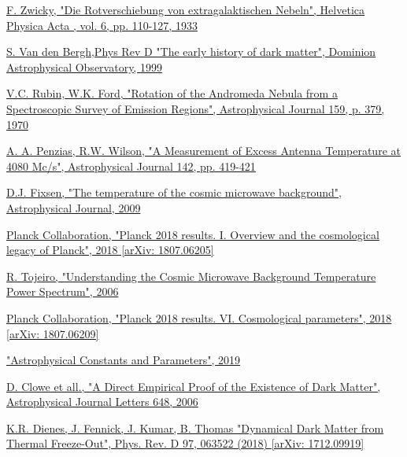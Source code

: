 \documentclass[a4paper, 10pt, openright]{report}
\begin{document}
\begin{thebibliography}{1}
\href{http://articles.adsabs.harvard.edu/cgi-bin/nph-iarticle_query?1933AcHPh...6..110Z&amp;data_type=PDF_HIGH&amp;whole_paper=YES&amp;type=PRINTER&amp;filetype=.pdf}{
F. Zwicky,
"Die Rotverschiebung von extragalaktischen Nebeln",
Helvetica Physica Acta , vol. 6, pp. 110-127, 1933}

\href{https://arxiv.org/pdf/astro-ph/9904251.pdf}{S. Van den Bergh,Phys Rev D
"The early history of dark matter",
Dominion Astrophysical Observatory, 1999
}

\href{https://ui.adsabs.harvard.edu/abs/1970ApJ...159..379R/abstract}{V.C. Rubin, W.K. Ford,
"Rotation of the Andromeda Nebula from a Spectroscopic Survey of Emission Regions",
Astrophysical Journal 159, p. 379, 1970
}

\href{https://ui.adsabs.harvard.edu/abs/1965ApJ...142..419P/abstract}{A. A. Penzias, R.W. Wilson,
"A Measurement of Excess Antenna Temperature at 4080 Mc/s",
Astrophysical Journal 142, pp. 419-421
}

\href{https://iopscience.iop.org/article/10.1088/0004-637X/707/2/916}{D.J. Fixsen,
"The temperature of the cosmic microwave background",
Astrophysical Journal, 2009
}

\href{https://arxiv.org/abs/1807.06205}{Planck Collaboration, 
"Planck 2018 results. I. Overview and the cosmological legacy of Planck", 2018 [arXiv: 1807.06205]
}


\href{https://www.roe.ac.uk/ifa/postgrad/pedagogy/2006_tojeiro.pdf}{R. Tojeiro,
"Understanding the Cosmic Microwave Background Temperature Power Spectrum",
2006
}

\href{https://arxiv.org/abs/1807.06209}{Planck Collaboration, 
"Planck 2018 results. VI. Cosmological parameters", 2018 [arXiv: 1807.06209]
}

\href{http://pdg.lbl.gov/2019/reviews/rpp2018-rev-astrophysical-constants.pdf}{
"Astrophysical Constants and Parameters", 
2019
}

\href{https://iopscience.iop.org/article/10.1086/508162}{D. Clowe et all.,
"A Direct Empirical Proof of the Existence of Dark Matter",
Astrophysical Journal Letters 648, 2006
}

\href{https://arxiv.org/pdf/1712.09919.pdf}{K.R. Dienes, J. Fennick, J. Kumar, B. Thomas
"Dynamical Dark Matter from Thermal Freeze-Out",
Phys. Rev. D 97, 063522 (2018) [arXiv: 1712.09919]
}


\end{thebibliography}
\end{document}
